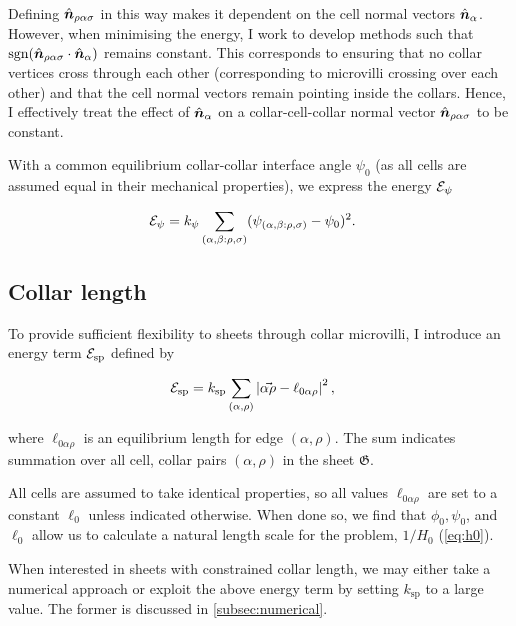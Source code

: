 Defining $\hat{\bm{n}}_{\rho\alpha\sigma}$ in this way makes it dependent on the cell normal vectors $\hat{\bm{n}}_\alpha$. 
However, when minimising the energy, I work to develop methods such that $\operatorname{sgn} (\hat{\bm{n}}_{\rho\alpha\sigma} \cdot \hat{\bm{n}}_\alpha)$ remains constant. 
This corresponds to ensuring that no collar vertices cross through each other (corresponding to microvilli crossing over each other) and that the cell normal vectors remain pointing inside the collars.
Hence, I effectively treat the effect of $\hat{\bm{n}}_\alpha$ on a collar-cell-collar normal vector $\hat{\bm{n}}_{\rho\alpha\sigma}$ to be constant.

With a common equilibrium collar-collar interface angle $\psi_0$ (as all cells are assumed equal in their mechanical properties), we express the energy $\mathcal{E}_\psi$ 

\begin{align}
	\mathcal{E}_\psi &= k_\psi \sum_{(\alpha, \beta: \rho, \sigma)} (\psi_{(\alpha, \beta: \rho, \sigma)} - \psi_0)^2. \label{eq:e_psi}
\end{align}

\subsection{Collar length}

To provide sufficient flexibility to sheets through collar microvilli, I introduce an energy term $\mathcal{E}_{\text{sp}}$ defined by 

\begin{align}
	\mathcal{E}_{\text{sp}} &= k_{\text{sp}} \sum_{(\alpha, \rho)} \left| \vec{\alpha\rho} - \ell_{0\alpha\rho} \right|^2, \label{eq:e_sp}
\end{align}

\noindent where $\ell_{0\alpha\rho}$ is an equilibrium length for edge $(\alpha, \rho)$. The sum indicates summation over all cell, collar pairs $(\alpha, \rho)$ in the sheet $\mathfrak{G}$.

All cells are assumed to take identical properties, so all values $\ell_{0\alpha\rho}$ are set to a constant $\ell_0$ unless indicated otherwise. 
When done so, we find that $\phi_0, \psi_0$, and $\ell_0$ allow us to calculate a natural length scale for the problem, $1/H_0$ (\cref{eq:h0}).

When interested in sheets with constrained collar length, we may either take a numerical approach or exploit the above energy term by setting $k_{\text{sp}}$ to a large value. 
The former is discussed in \cref{subsec:numerical}.

